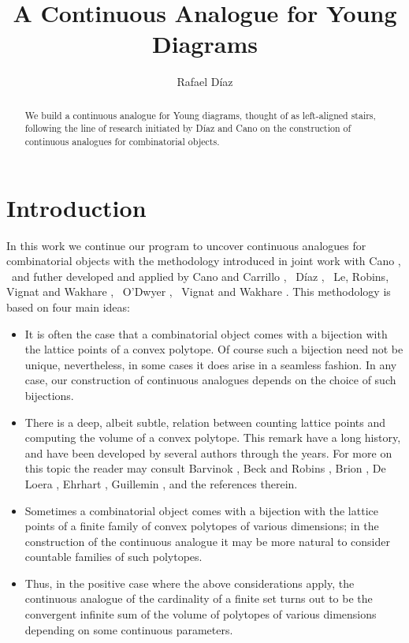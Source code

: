 \documentclass[10pt,leqeq]{article}
\date{}
\begin{document}
\setlength{\baselineskip}{16pt}
\title{A Continuous Analogue for Young Diagrams}
\author{Rafael D\'iaz}
\maketitle

\begin{abstract}
We build a continuous analogue for Young diagrams, thought of as left-aligned stairs, following the line of research initiated by D\'iaz and Cano on the construction of continuous analogues for combinatorial objects.
\end{abstract}


\section{Introduction}

In this work we continue our program to uncover continuous analogues for combinatorial objects with the methodology introduced in joint work with Cano \cite{cd, dc}, \ and futher developed and applied by Cano and Carrillo \cite{cc}, \ D\'iaz \cite{d}, \
Le, Robins, Vignat and Wakhare \cite{lrvw}, \ O'Dwyer \cite{rod}, \ Vignat and Wakhare \cite{vw}. This methodology is based on four main ideas:

\begin{itemize}
   \item It is often the case that a combinatorial object comes with a bijection with the lattice points of a convex polytope. Of course such a bijection need not be unique, nevertheless, in some cases it does arise in a seamless fashion. In any case, our construction of continuous analogues depends on the choice of such  bijections. 

  \item There is a deep, albeit subtle, relation between counting lattice points and computing the volume of a convex polytope. This remark have a long history, and have been developed by several authors through the years.  For more on this topic the reader may consult
      Barvinok \cite{b}, Beck and Robins \cite{ber}, Brion \cite{br}, De Loera \cite{de}, Ehrhart \cite{e}, Guillemin \cite{g}, and the references therein. 
  
  \item Sometimes a combinatorial object comes with a bijection with the lattice points of a finite family of convex polytopes of various dimensions; in the construction of the continuous analogue it may be more natural to consider countable families of such polytopes.
      
  \item  Thus, in the positive case where the above considerations apply, the continuous analogue of the cardinality of a finite set turns out to be the convergent infinite sum of the volume of polytopes of various dimensions depending on some continuous parameters.
  
  \end{itemize}
\end{document}
